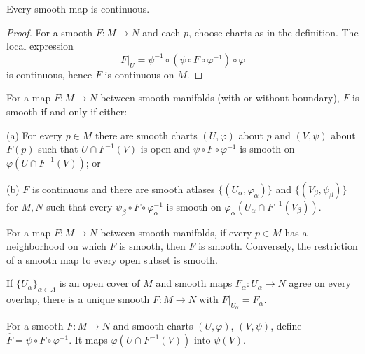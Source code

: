 \begin{proposition}
\label{prop:2-4}
\mathlibok
{}
Every smooth map is continuous.
\end{proposition}

\begin{proof}
\sketch For a smooth $F:M\to N$ and each $p$, choose charts as in the definition. The local expression
\[
F|_U=\psi^{-1}\circ(\psi\circ F\circ\varphi^{-1})\circ\varphi
\]
is continuous, hence $F$ is continuous on $M$.
\end{proof}

\begin{proposition}
\label{prop:2-5}
\mathlibok
{}
For a map $F:M\to N$ between smooth manifolds (with or without boundary), $F$ is smooth if and only if either:

(a) For every $p\in M$ there are smooth charts $(U,\varphi)$ about $p$ and $(V,\psi)$ about $F(p)$ such that $U\cap F^{-1}(V)$ is open and $\psi\circ F\circ\varphi^{-1}$ is smooth on $\varphi(U\cap F^{-1}(V))$; or

(b) $F$ is continuous and there are smooth atlases $\{(U_\alpha,\varphi_\alpha)\}$ and $\{(V_\beta,\psi_\beta)\}$ for $M,N$ such that every $\psi_\beta\circ F\circ\varphi_\alpha^{-1}$ is smooth on $\varphi_\alpha(U_\alpha\cap F^{-1}(V_\beta))$.
\end{proposition}

\begin{proposition}
\label{prop:2-6}
\mathlibok
{}
For a map $F:M\to N$ between smooth manifolds, if every $p\in M$ has a neighborhood on which $F$ is smooth, then $F$ is smooth. Conversely, the restriction of a smooth map to every open subset is smooth.
\end{proposition}


\begin{corollary}
\label{cor:2-8}
\leanok
{}
If $\{U_\alpha\}_{\alpha\in A}$ is an open cover of $M$ and smooth maps $F_\alpha:U_\alpha\to N$ agree on every overlap, there is a unique smooth $F:M\to N$ with $F|_{U_\alpha}=F_\alpha$.
\end{corollary}

\begin{definition}
\label{def:2-8-extra-6}
\leanok
For a smooth $F:M\to N$ and smooth charts $(U,\varphi)$, $(V,\psi)$, define $\widehat F=\psi\circ F\circ\varphi^{-1}$. It maps $\varphi(U\cap F^{-1}(V))$ into $\psi(V)$.
\end{definition}


